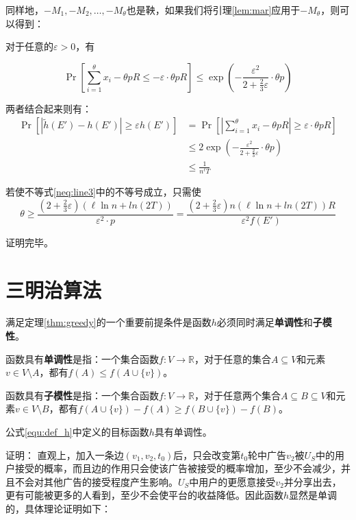 同样地，$-M_1,-M_2,\ldots,-M_\theta$也是鞅，如果我们将引理\ref{lem:mar}应用于$-M_{\theta}$，则可以得到：

对于任意的$\varepsilon>0$，有

\begin{equation}
\Pr\left[\sum_{i=1}^{\theta}x_i- \theta pR \le - \varepsilon \cdot \theta p R\right] \le \exp(-\frac{\varepsilon^2}{2+\frac{2}{3}\varepsilon}\cdot \theta p)
\end{equation}

两者结合起来则有：
\begin{align}
    \Pr[|\tilde{h}(E')-h(E')|\ge \varepsilon h(E')] 
    &=\Pr\left[\left|\sum_{i=1}^{\theta}x_i- \theta pR \right|\ge \varepsilon \cdot \theta p R\right] \\ 
    & \le 2\exp(-\frac{\varepsilon^2}{2+\frac{2}{3}\varepsilon}\cdot \theta p) \\
    & \le \frac{1}{n^{\ell}T} \label{neq:line3}
\end{align}

若使不等式\ref{neq:line3}中的不等号成立，只需使
\begin{equation}
\theta \ge \frac{(2+\frac{2}{3}\varepsilon)(\ell\ln n+ln(2T))}{\varepsilon^2\cdot p}=\frac{(2+\frac{2}{3}\varepsilon)n(\ell\ln n+ln(2T)) R}{\varepsilon^2f(E')}
\end{equation}

证明完毕。

\section{三明治算法}
\label{sec:sand}
满足定理\ref{thm:greedy}的一个重要前提条件是函数$h$必须同时满足{\bfseries 单调性}和{\bfseries 子模性}。\cite{nemhauser1978analysis}

函数具有{\bfseries 单调性}是指：一个集合函数$f:V\to \mathbb{R}$，对于任意的集合$A \subseteq V$和元素$v \in V\setminus A$，都有$f(A)\le f(A\cup\{v\})$。

函数具有{\bfseries 子模性}是指：一个集合函数$f:V\to \mathbb{R}$，对于任意两个集合$A\subseteq B \subseteq V$和元素$v \in V \setminus B$，都有$f(A \cup \{v\})-f(A) \ge f(B\cup \{v\})-f(B)$。
\begin{lemma}
\label{lem:h_mon}
公式\ref{equ:def_h}中定义的目标函数$h$具有单调性。
\end{lemma}
证明：
直观上，加入一条边$(v_1,v_2,t_0)$后，只会改变第$t_0$轮中广告$v_2$被$U_S$中的用户接受的概率，而且边的作用只会使该广告被接受的概率增加，至少不会减少，并且不会对其他广告的接受程度产生影响。$U_S$中用户的更愿意接受$v_2$并分享出去，更有可能被更多的人看到，至少不会使平台的收益降低。因此函数$h$显然是单调的，具体理论证明如下：

